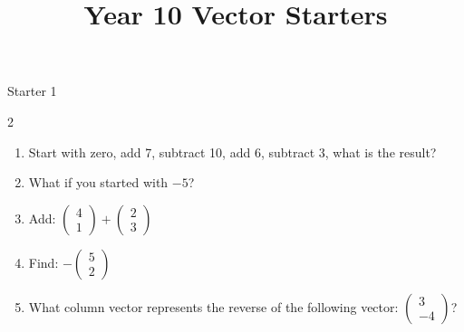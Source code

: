 \documentclass{beamer}
\title{Year 10 Vector Starters}
\date{}
\newcommand{\ashow}[1]{\uncover<2->{\textcolor{red}{\small #1}}}
\begin{document}
\frame{\titlepage}

\begin{frame}{Starter 1}

\begin{multicols}{2}
\begin{enumerate}
  \item Start with zero, add 7, subtract 10, add 6, subtract 3, what is the result? \ashow{0}
  \item What if you started with $-5$? \ashow{$-5$}
  \item Add:
  $\begin{pmatrix}4\\1\end{pmatrix}
  +
  \begin{pmatrix}2\\3\end{pmatrix}$ \ashow{\(\binom{6}{4}\)}
  \item Find:
  $-\begin{pmatrix}5\\2\end{pmatrix}$ \ashow{\(\binom{-5}{-2}\)}
  \item What column vector represents the reverse of the following vector:
  $\begin{pmatrix}3\\-4\end{pmatrix}$? \ashow{\(\binom{-3}{4}\)}
\end{enumerate}
\end{multicols}

\vspace{0.3cm}



\begin{columns}[T]

\begin{center}
\end{center}


\end{columns}
\end{frame}
\end{document}
